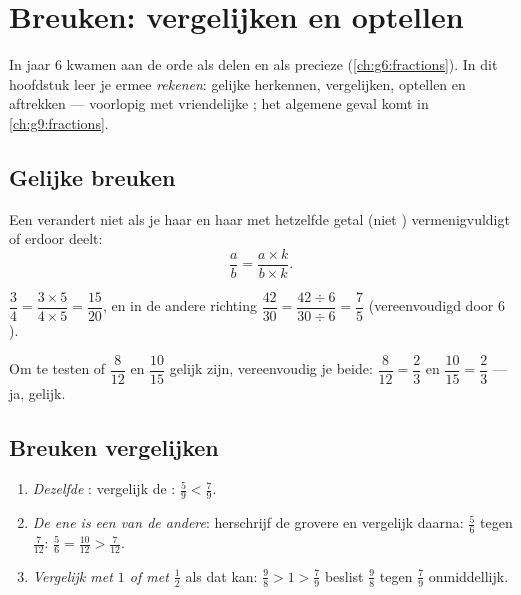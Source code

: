 \chapter{Breuken: vergelijken en optellen}\label{ch:g7:fractions}

In jaar 6 kwamen  aan de orde als delen en als precieze 
(\cref{ch:g6:fractions}). In dit hoofdstuk leer je ermee \emph{rekenen}: gelijke
 herkennen, vergelijken, optellen en aftrekken --- voorlopig met
vriendelijke ; het algemene geval komt in \cref{ch:g9:fractions}.

\section{Gelijke breuken}

\begin{theorem}\label{thm:g7:fractions:equal}
Een  verandert niet als je haar  en haar  met hetzelfde getal
(niet ) vermenigvuldigt of erdoor deelt:
\[
\frac{a}{b} = \frac{a \times k}{b \times k} .
\]
\end{theorem}
\admitted

\begin{example}\label{ex:g7:fractions:equal}
$\dfrac{3}{4} = \dfrac{3 \times 5}{4 \times 5} = \dfrac{15}{20}$, en in de andere
richting $\dfrac{42}{30} = \dfrac{42 \div 6}{30 \div 6} = \dfrac{7}{5}$
(vereenvoudigd door $6$).

Om te testen of $\dfrac{8}{12}$ en $\dfrac{10}{15}$ gelijk zijn, vereenvoudig je
beide: $\dfrac{8}{12} = \dfrac{2}{3}$ en $\dfrac{10}{15} = \dfrac{2}{3}$ --- ja,
gelijk.
\end{example}

\section{Breuken vergelijken}

\begin{method}\label{met:g7:fractions:compare}
\begin{enumerate}
  \item \emph{Dezelfde }: vergelijk de :
        $\frac{5}{9} < \frac{7}{9}$.
  \item \emph{De ene  is een  van de andere}: herschrijf de
        grovere  en vergelijk daarna: $\frac{5}{6}$ tegen $\frac{7}{12}$:
        $\frac56 = \frac{10}{12} > \frac{7}{12}$.
  \item \emph{Vergelijk met $1$ of met $\frac12$} als dat kan:
        $\frac{9}{8} > 1 > \frac{7}{9}$ beslist $\frac98$ tegen $\frac79$
        onmiddellijk.
\end{enumerate}
\end{method}


